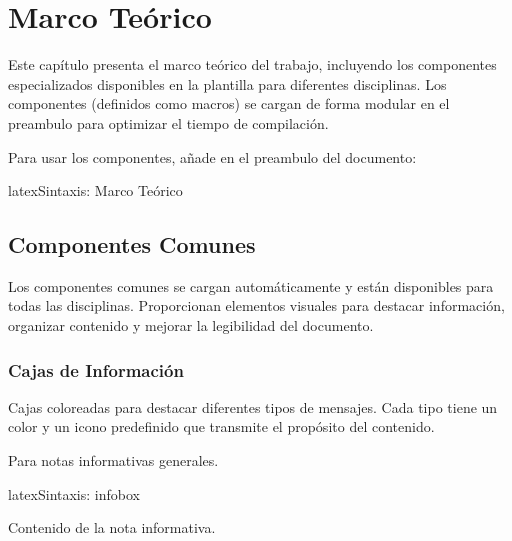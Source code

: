 \chapter{Marco Teórico}
\label{chap:marco-teorico}

Este capítulo presenta el marco teórico del trabajo, incluyendo los componentes
especializados disponibles en la plantilla para diferentes disciplinas.
Los componentes (definidos como \glspl{macro}) se cargan de forma modular
en el \gls{preambulo} para optimizar el tiempo de compilación.

Para usar los componentes, añade en el \gls{preambulo} del documento:

\begin{codigosimple}{latex}{Sintaxis: Marco Teórico}
\usepackage[all]{eps-componentes}  %
\usepackage[software,telecom]{eps-componentes}
\end{codigosimple}

\section{Componentes Comunes}
\label{sec:comp-comunes}

Los componentes comunes se cargan automáticamente y están disponibles para todas
las disciplinas. Proporcionan elementos visuales para destacar información,
organizar contenido y mejorar la legibilidad del documento.

\subsection{Cajas de Información}
\label{subsec:cajas-info}

Cajas coloreadas para destacar diferentes tipos de mensajes. Cada tipo tiene un
color y un icono predefinido que transmite el propósito del contenido.

Para notas informativas generales.

\begin{codigosimple}{latex}{Sintaxis: infobox}
\begin{infobox}
  Contenido de la nota informativa.
\end{infobox}
\end{codigosimple}

